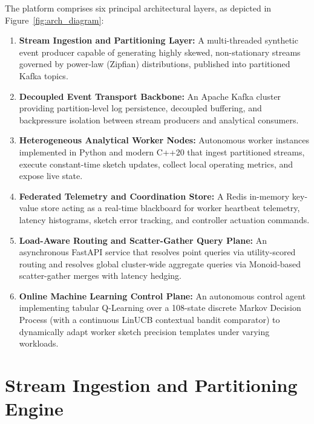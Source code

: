 The platform comprises six principal architectural layers, as depicted in Figure~\ref{fig:arch_diagram}:
\begin{enumerate}
 \item \textbf{Stream Ingestion and Partitioning Layer:} A multi-threaded synthetic event producer capable of generating highly skewed, non-stationary streams governed by power-law (Zipfian) distributions, published into partitioned Kafka topics.
 \item \textbf{Decoupled Event Transport Backbone:} An Apache Kafka cluster providing partition-level log persistence, decoupled buffering, and backpressure isolation between stream producers and analytical consumers.
 \item \textbf{Heterogeneous Analytical Worker Nodes:} Autonomous worker instances implemented in Python and modern C++20 that ingest partitioned streams, execute constant-time sketch updates, collect local operating metrics, and expose live state.
 \item \textbf{Federated Telemetry and Coordination Store:} A Redis in-memory key-value store acting as a real-time blackboard for worker heartbeat telemetry, latency histograms, sketch error tracking, and controller actuation commands.
 \item \textbf{Load-Aware Routing and Scatter-Gather Query Plane:} An asynchronous FastAPI service that resolves point queries via utility-scored routing and resolves global cluster-wide aggregate queries via Monoid-based scatter-gather merges with latency hedging.
 \item \textbf{Online Machine Learning Control Plane:} An autonomous control agent implementing tabular Q-Learning over a 108-state discrete Markov Decision Process (with a continuous LinUCB contextual bandit comparator) to dynamically adapt worker sketch precision templates under varying workloads.
\end{enumerate}

\section{Stream Ingestion and Partitioning Engine}

